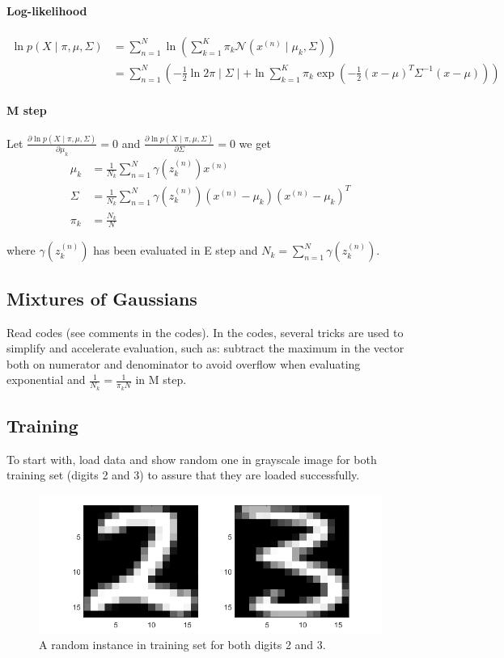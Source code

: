 \documentclass{article}
\begin{document}
\paragraph{Log-likelihood}
\[
\begin{aligned}
\ln p(X\mid\pi,\mu,\Sigma)&=\sum_{n=1}^N\ln\left(\sum_{k=1}^K\pi_k\mathcal N\left(x^{(n)}\mid\mu_k,\Sigma\right)\right)\\
&=\sum_{n=1}^N\left(
-\frac{1}{2}\ln2\pi\mid\Sigma\mid+\ln\sum_{k=1}^K\pi_k\exp\left(-\frac{1}{2}(x-\mu)^T\Sigma^{-1}(x-\mu)\right)\right)
\end{aligned}
\]

\paragraph{M step}
Let $\frac{\partial\ln p(X\mid\pi,\mu,\Sigma)}{\partial\mu_k}=0$ and $\frac{\partial\ln p(X\mid\pi,\mu,\Sigma)}{\partial\Sigma}=0$ we get
\[
\begin{aligned}
\mu_k&=\frac{1}{N_k}\sum_{n=1}^N\gamma\left(z_k^{(n)}\right)x^{(n)}\\
\Sigma&=\frac{1}{N_k}\sum_{n=1}^N\gamma\left(z_k^{(n)}\right)\left(x^{(n)}-\mu_k\right)\left(x^{(n)}-\mu_k\right)^T\\
\pi_k&=\frac{N_k}{N}
\end{aligned}
\]

where $\gamma\left(z_k^{(n)}\right)$ has been evaluated in E step and $N_k=\sum_{n=1}^N\gamma\left(z_k^{(n)}\right)$.\par

\subsection{Mixtures of Gaussians}
Read codes (see comments in the codes). In the codes, several tricks are used to simplify and accelerate evaluation, such as: subtract the maximum in the vector both on numerator and denominator to avoid overflow when evaluating exponential and $\frac{1}{N_k}=\frac{1}{\pi_kN}$ in M step.

\subsection{Training}
To start with, load data and show random one in grayscale image for both training set (digits 2 and 3) to assure that they are loaded successfully.\par

\begin{figure}[H]
	\centering
	\includegraphics[scale=0.5]{figure16}
	\caption{A random instance in training set for both digits 2 and 3.}
	\label{fig16}
\end{figure}
\end{document}
